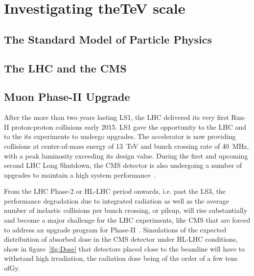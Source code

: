 \graphicspath{{chapt_dutch/}{intro/}{chapt2/}{chapt3/}{chapt4/}{chapt5/}{chapt6/}{chapt7/}}

\renewcommand\evenpagerightmark{{\scshape\small Chapter 2}}
\renewcommand\oddpageleftmark{{\scshape\small Investigating the\si{TeV} scale}}

\renewcommand{\bibname}{References}

\hyphenation{}

\chapter[Investigating the\si{TeV} scale]%
{Investigating the\si{TeV} scale}
\label{chap:2}

\section{The Standard Model of Particle Physics}
\label{sec:SM}

\section{The \acl{LHC} and the \acl{CMS}}
\label{sec:LHC-CMS}

\section{Muon Phase-II Upgrade}
\label{sec:phase-2}

After the more than two years lasting \acf{LS1}, the \acf{LHC} delivered its very first Run-II proton-proton collisions early 2015. LS1 gave the opportunity to the LHC and to the its experiments to undergo upgrades. The accelerator is now providing collisions at center-of-mass energy of \SI{13}{TeV} and bunch crossing rate of \SI{40}{MHz}, with a peak luminosity exceeding its design value. During the first and upcoming second LHC Long Shutdown, the \acf{CMS} detector is also undergoing a number of upgrades to maintain a high system performance~\cite{MUONTDR}.

From the LHC Phase-2 or \acf{HL-LHC} period onwards, i.e. past the \acf{LS3}, the performance degradation due to integrated radiation as well as the average number of inelastic collisions per bunch crossing, or pileup, will rise substantially and become a major challenge for the LHC experiments, like CMS that are forced to address an upgrade program for Phase-II~\cite{PHASEIITP}. Simulations of the expected distribution of absorbed dose in the CMS detector under HL-LHC conditions, show in figure~\ref{fig:Dose} that detectors placed close to the beamline will have to withstand high irradiation, the radiation dose being of the order of a few tens of\si{Gy}.

